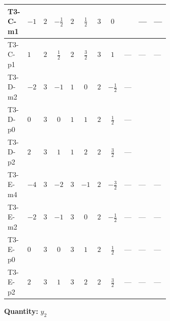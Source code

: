 \documentclass[8pt]{article}
\begin{document}
\begin{landscape}
\begin{longtable}{@{}llcccccc >{\raggedright\arraybackslash}p{0.21\linewidth} >{\raggedright\arraybackslash}p{0.21\linewidth} >{\raggedright\arraybackslash}p{0.21\linewidth}@{}}
\midrule
T3-C-m1 & $-1$ & $2$ & $-\frac{1}{2}$ & $2$ & $\frac{1}{2}$ & $3$ & $0$ & \scriptsize\adjustbox{max width=\linewidth}{$\begin{gathered} +\frac{1}{4} (3 \left({y_1}\,\left({y_1}\right)^{\dagger}\,{y_2}\right)_{ij}+2 \left({y_2}\,\left({y_1}\right)^{\dagger}\,{y_1}\right)_{ij}+2 \left({Y_e}\,\left({Y_e}\right)^{\dagger}\,{y_2}\right)_{ij}+5 \left({y_2}\,\left({y_2}\right)^{\dagger}\,{y_2}\right)_{ij})\end{gathered}$} & --- & --- \\
\midrule
T3-C-p1 & $1$ & $2$ & $\frac{1}{2}$ & $2$ & $\frac{3}{2}$ & $3$ & $1$ & --- & --- & --- \\
\midrule
T3-D-m2 & $-2$ & $3$ & $-1$ & $1$ & $0$ & $2$ & $-\frac{1}{2}$ & --- & \scriptsize\adjustbox{max width=\linewidth}{$\begin{gathered} 2 T_{\nu}^{(2)} \left({y_2}\right)_{ij}\end{gathered}$} & \scriptsize\adjustbox{max width=\linewidth}{$\begin{gathered} +\frac{3}{4} \left({y_1}\,\left({y_1}\right)^{\dagger}\,{y_2}\right)_{ij}\end{gathered}$} \\
\midrule
T3-D-p0 & $0$ & $3$ & $0$ & $1$ & $1$ & $2$ & $\frac{1}{2}$ & --- & \scriptsize\adjustbox{max width=\linewidth}{$\begin{gathered} 2 T_{\nu}^{(2)} \left({y_2}\right)_{ij}\end{gathered}$} & \scriptsize\adjustbox{max width=\linewidth}{$\begin{gathered} +\frac{3}{4} \left({y_1}\,\left({y_1}\right)^{\dagger}\,{y_2}\right)_{ij}\end{gathered}$} \\
\midrule
T3-D-p2 & $2$ & $3$ & $1$ & $1$ & $2$ & $2$ & $\frac{3}{2}$ & --- & \scriptsize\adjustbox{max width=\linewidth}{$\begin{gathered} 2 T_{\nu}^{(2)} \left({y_2}\right)_{ij}\end{gathered}$} & \scriptsize\adjustbox{max width=\linewidth}{$\begin{gathered} +\frac{3}{4} \left({y_1}\,\left({y_1}\right)^{\dagger}\,{y_2}\right)_{ij}\end{gathered}$} \\
\midrule
T3-E-m4 & $-4$ & $3$ & $-2$ & $3$ & $-1$ & $2$ & $-\frac{3}{2}$ & --- & --- & --- \\
\midrule
T3-E-m2 & $-2$ & $3$ & $-1$ & $3$ & $0$ & $2$ & $-\frac{1}{2}$ & --- & --- & --- \\
\midrule
T3-E-p0 & $0$ & $3$ & $0$ & $3$ & $1$ & $2$ & $\frac{1}{2}$ & --- & --- & --- \\
\midrule
T3-E-p2 & $2$ & $3$ & $1$ & $3$ & $2$ & $2$ & $\frac{3}{2}$ & --- & --- & --- \\
\midrule
\bottomrule
\end{longtable}
\clearpage
\noindent\textbf{Quantity: }$y_2$\par\smallskip

\end{landscape}
\end{document}
